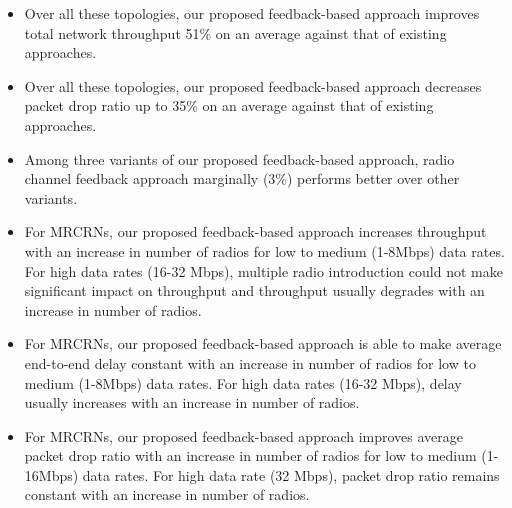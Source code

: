 \begin{itemize}
    \item Over all these topologies, our proposed feedback-based approach improves total network throughput 51\% on an average against that of existing approaches.
    \item Over all these topologies, our proposed feedback-based approach decreases packet drop ratio up to 35\% on an average against that of existing approaches.
    \item Among three variants of our proposed feedback-based approach, radio channel feedback approach marginally (3\%) performs better over other variants.
    \item For MRCRNs, our proposed feedback-based approach increases throughput with an increase in number of radios for low to medium (1-8Mbps) data rates. For high data rates (16-32 Mbps), multiple radio introduction could not make significant impact on throughput and throughput usually degrades with an increase in number of radios.
    \item For MRCRNs, our proposed feedback-based approach is able to make average end-to-end delay constant with an increase in number of radios for low to medium (1-8Mbps) data rates. For high data rates (16-32 Mbps), delay usually increases with an increase in number of radios.
    \item For MRCRNs, our proposed feedback-based approach improves average packet drop ratio with an increase in number of radios for low to medium (1-16Mbps) data rates. For high data rate (32 Mbps), packet drop ratio remains constant with an increase in number of radios.
\end{itemize}

\endinput
